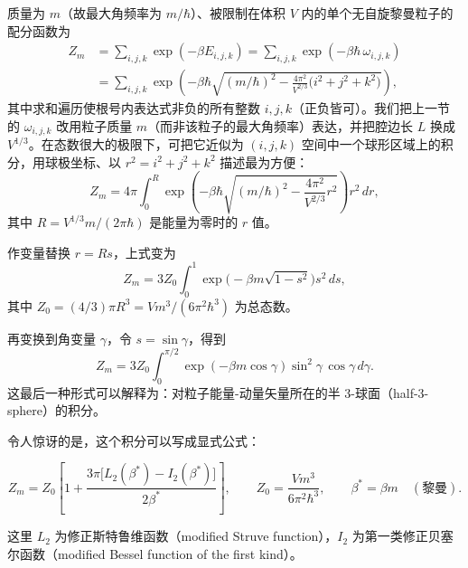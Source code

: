 质量为 $m$（故最大角频率为 $m/\hbar$）、被限制在体积 $V$ 内的单个无自旋黎曼粒子的配分函数为
\begin{align}
Z_{m}
&=\sum_{i,j,k}\exp(-\beta E_{i,j,k})
=\sum_{i,j,k}\exp(-\beta\hbar\,\omega_{i,j,k}) \nonumber\\
&=\sum_{i,j,k}\exp\!\left(-\beta\hbar\sqrt{(m/\hbar)^{2}-\frac{4\pi^{2}}{V^{2/3}}\bigl(i^{2}+j^{2}+k^{2}\bigr)}\right),
\end{align}
其中求和遍历使根号内表达式非负的所有整数 $i,j,k$（正负皆可）。我们把上一节的 $\omega_{i,j,k}$ 改用粒子质量 $m$（而非该粒子的最大角频率）表达，并把腔边长 $L$ 换成 $V^{1/3}$。在态数很大的极限下，可把它近似为 $(i,j,k)$ 空间中一个球形区域上的积分，用球极坐标、以 $r^{2}=i^{2}+j^{2}+k^{2}$ 描述最为方便：
\begin{equation}
Z_{m}=4\pi\int_{0}^{R}
\exp\!\left(-\beta\hbar\sqrt{(m/\hbar)^{2}-\frac{4\pi^{2}}{V^{2/3}}r^{2}}\right)r^{2}\,dr,
\end{equation}
其中 $R=V^{1/3}m/(2\pi\hbar)$ 是能量为零时的 $r$ 值。

作变量替换 $r=Rs$，上式变为
\begin{equation}
Z_{m}=3Z_{0}\int_{0}^{1}\exp\!\bigl(-\beta m\sqrt{1-s^{2}}\bigr)s^{2}\,ds,
\end{equation}
其中 $Z_{0}=(4/3)\pi R^{3}=Vm^{3}/(6\pi^{2}\hbar^{3})$ 为总态数。

再变换到角变量 $\gamma$，令 $s=\sin\gamma$，得到
\begin{equation}
Z_{m}=3Z_{0}\int_{0}^{\pi/2}\exp(-\beta m\cos\gamma)\sin^{2}\gamma\,\cos\gamma\,d\gamma .
\end{equation}
这最后一种形式可以解释为：对粒子能量-动量矢量所在的半 3-球面（half-3-sphere）的积分。

令人惊讶的是，这个积分可以写成显式公式：

\begin{keybox}
\begin{equation}
Z_{m}=Z_{0}\left[1+\frac{3\pi\bigl[L_{2}(\beta^{*})-I_{2}(\beta^{*})\bigr]}{2\beta^{*}}\right],
\qquad
Z_{0}=\frac{Vm^{3}}{6\pi^{2}\hbar^{3}},
\qquad
\beta^{*}=\beta m \quad(\text{黎曼}).
\end{equation}
\end{keybox}

这里 $L_{2}$ 为修正斯特鲁维函数（modified Struve function），$I_{2}$ 为第一类修正贝塞尔函数（modified Bessel function of the first kind）。


